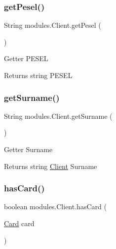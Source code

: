 \subsubsection{\texorpdfstring{get\+Pesel()}{getPesel()}}
{\footnotesize\ttfamily String modules.\+Client.\+get\+Pesel (\begin{DoxyParamCaption}{ }\end{DoxyParamCaption})\hspace{0.3cm}{\ttfamily [inline]}}

Getter P\+E\+S\+EL \begin{DoxyReturn}{Returns}
string P\+E\+S\+EL 
\end{DoxyReturn}
\mbox{\label{classmodules_1_1_client_a9edde75585aa9be7aebb9a9b818c6e12}} 
\subsubsection{\texorpdfstring{get\+Surname()}{getSurname()}}
{\footnotesize\ttfamily String modules.\+Client.\+get\+Surname (\begin{DoxyParamCaption}{ }\end{DoxyParamCaption})\hspace{0.3cm}{\ttfamily [inline]}}

Getter Surname \begin{DoxyReturn}{Returns}
string \mbox{\hyperlink{classmodules_1_1_client}{Client}} Surname 
\end{DoxyReturn}
\mbox{\label{classmodules_1_1_client_aa2b00842b4607600838347f2410c97ec}} 
\subsubsection{\texorpdfstring{has\+Card()}{hasCard()}\hspace{0.1cm}{\footnotesize\ttfamily [1/2]}}
{\footnotesize\ttfamily boolean modules.\+Client.\+has\+Card (\begin{DoxyParamCaption}\item[{\mbox{\hyperlink{classmodules_1_1bank_1_1_card}{Card}}}]{card }\end{DoxyParamCaption})\hspace{0.3cm}{\ttfamily [inline]}}

